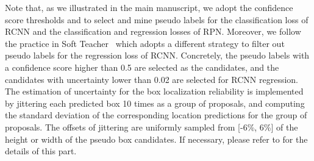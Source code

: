 \documentclass[10pt,twocolumn,letterpaper]{article}
\begin{document}
\begin{table*}[h]
\centering
\vspace{-.0em}
\caption{The summary of training settings for different datasets and different settings. We follow the practive of Soft Teacher~\cite{softTeacher}, STAC~\cite{STAC}, and FixMatch~\cite{Fixmatch} to adopt different hyper-parameters for labeled data augmentation, and unlabeled strong-weak augmentation.}
\label{tab:augment}
\vspace{0em}
\end{table*}



Note that, as we illustrated in the main manuscript, we adopt the confidence score thresholds  and  to select and mine pseudo labels for the classification loss of RCNN and the classification and regression losses of RPN. Moreover, we follow the practice in Soft Teacher~\cite{softTeacher} which adopts a different strategy to filter out pseudo labels for the regression loss of RCNN. Concretely, the pseudo labels with a confidence score higher than 0.5 are selected as the candidates, and the candidates with uncertainty lower than 0.02 are selected for RCNN regression. The estimation of uncertainty for the box localization reliability is implemented by jittering each predicted box 10 times as a group of proposals, and computing the standard deviation of the corresponding location predictions for the group of proposals. The offsets of jittering are uniformly sampled from [-6\%, 6\%] of the height or width of the pseudo box candidates. If necessary, please refer to \cite{softTeacher} for the details of this part. 
\end{document}
